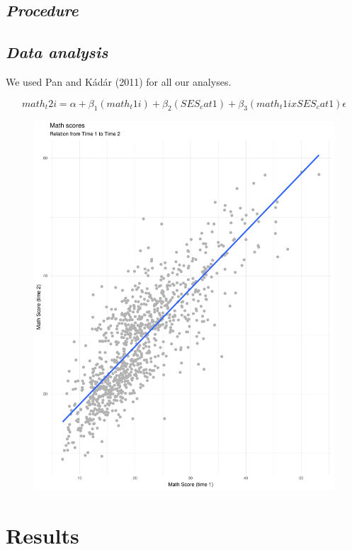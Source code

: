 \documentclass[man, fleqn, noextraspace]{apa6}
\begin{document}
\subsection{\texorpdfstring{\emph{Procedure}}{Procedure}}\label{procedure}

\subsection{\texorpdfstring{\emph{Data
analysis}}{Data analysis}}\label{data-analysis}

We used Pan and Kádár (2011) for all our analyses.

\[
math_t2i = \alpha + \beta_1(math_t1i) + \beta_2(SES_cat1) + \beta_3(math_t1i x SES_cat1)\epsilon 
\]

\begin{figure}
\centering
\includegraphics{Lab9-Heidi-Jeongim-Jungah_files/figure-latex/Question5-1.pdf}
\caption{}
\end{figure}

\section{\texorpdfstring{\textbf{Results}}{Results}}\label{results}
\end{document}

